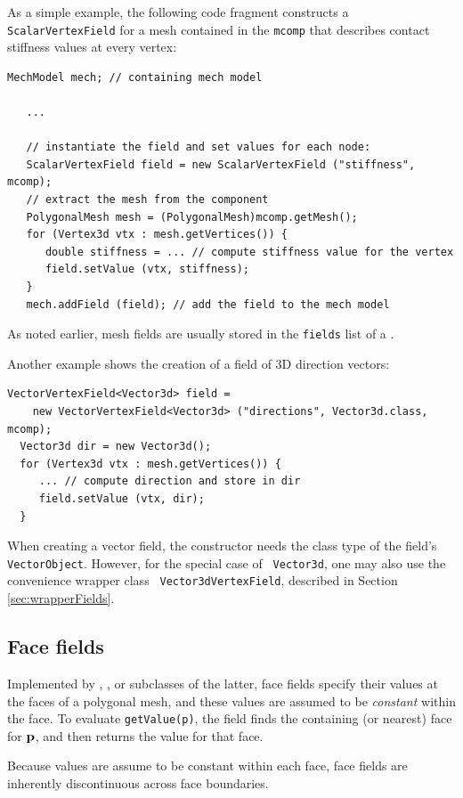 As a simple example, the following code fragment constructs a {\tt
ScalarVertexField} for a mesh contained in the 
 {\tt mcomp}
that describes contact stiffness values 
at every vertex:
%
\begin{lstlisting}[]
   MechModel mech; // containing mech model
   
   ...

   // instantiate the field and set values for each node:
   ScalarVertexField field = new ScalarVertexField ("stiffness", mcomp);
   // extract the mesh from the component
   PolygonalMesh mesh = (PolygonalMesh)mcomp.getMesh();
   for (Vertex3d vtx : mesh.getVertices()) {
      double stiffness = ... // compute stiffness value for the vertex
      field.setValue (vtx, stiffness);
   }
   mech.addField (field); // add the field to the mech model
\end{lstlisting}
%
As noted earlier, mesh fields are usually stored in the {\tt fields}
list of a .

Another example shows the creation of a field of 3D direction vectors:
%
\begin{lstlisting}[]
  VectorVertexField<Vector3d> field =
    new VectorVertexField<Vector3d> ("directions", Vector3d.class, mcomp);
  Vector3d dir = new Vector3d();
  for (Vertex3d vtx : mesh.getVertices()) {
     ... // compute direction and store in dir
     field.setValue (vtx, dir);
  }
\end{lstlisting}
%
When creating a vector field, the constructor needs the class type of
the field's {\tt VectorObject}. However, for the special case of {\tt
Vector3d}, one may also use the convenience wrapper class {\tt
Vector3dVertexField}, described in Section \ref{sec:wrapperFields}.

\subsection{Face fields}

Implemented by
,
, 
or subclasses of the latter, face fields specify their values at the
faces of a polygonal mesh, and these values are assumed to be {\it
constant} within the face. To evaluate {\tt getValue(p)}, the field
finds the containing (or nearest) face for ${\bf p}$, and then returns the
value for that face.

\begin{sideblock}
Because values are assume to be constant within each face, face fields
are inherently discontinuous across face boundaries.
\end{sideblock}

